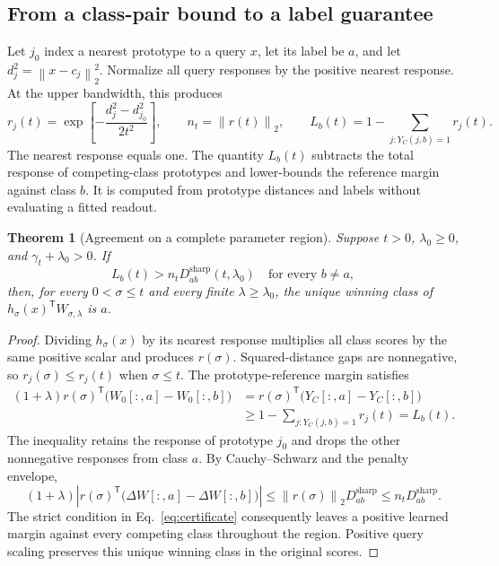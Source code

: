 \documentclass[preprint,12pt,authoryear]{elsarticle}
\newtheorem{theorem}{Theorem}
\newcommand{\norm}[1]{\left\lVert#1\right\rVert}
\newcommand{\tr}{\mathsf{T}}
\newcommand{\sharpb}{\mathrm{sharp}}
\begin{document}
\subsection{From a class-pair bound to a label guarantee}
Let $j_0$ index a nearest prototype to a query $x$, let its label be $a$, and let $d_j^2=\norm{x-c_j}_2^2$. Normalize all query responses by the positive nearest response. At the upper bandwidth, this produces
\begin{equation}
 r_j(t)=\exp\left[-\frac{d_j^2-d_{j_0}^2}{2t^2}\right],\qquad
 n_t=\norm{r(t)}_2,\qquad
 L_b(t)=1-\sum_{j:Y_C(j,b)=1}r_j(t).
 \label{eq:query}
\end{equation}
The nearest response equals one. The quantity $L_b(t)$ subtracts the total response of competing-class prototypes and lower-bounds the reference margin against class $b$. It is computed from prototype distances and labels without evaluating a fitted readout.

\begin{theorem}[Agreement on a complete parameter region]
Suppose $t>0$, $\lambda_0\geq0$, and $\gamma_t+\lambda_0>0$. If
\begin{equation}
 L_b(t)>n_tD^{\sharpb}_{ab}(t,\lambda_0)
 \quad\text{for every }b\ne a,
 \label{eq:certificate}
\end{equation}
then, for every $0<\sigma\leq t$ and every finite $\lambda\geq\lambda_0$, the unique winning class of $h_\sigma(x)^\tr W_{\sigma,\lambda}$ is $a$.
\label{thm:agreement}
\end{theorem}
\begin{proof}
Dividing $h_\sigma(x)$ by its nearest response multiplies all class scores by the same positive scalar and produces $r(\sigma)$. Squared-distance gaps are nonnegative, so $r_j(\sigma)\leq r_j(t)$ when $\sigma\leq t$. The prototype-reference margin satisfies
\begin{align*}
 (1+\lambda)r(\sigma)^\tr\bigl(W_0[:,a]-W_0[:,b]\bigr)
 &=r(\sigma)^\tr\bigl(Y_C[:,a]-Y_C[:,b]\bigr)\\
 &\geq 1-\sum_{j:Y_C(j,b)=1}r_j(t)=L_b(t).
\end{align*}
The inequality retains the response of prototype $j_0$ and drops the other nonnegative responses from class $a$. By Cauchy--Schwarz and the penalty envelope,
\[
 (1+\lambda)\left|r(\sigma)^\tr
       \bigl(\Delta W[:,a]-\Delta W[:,b]\bigr)\right|
 \leq \norm{r(\sigma)}_2D^{\sharpb}_{ab}
 \leq n_tD^{\sharpb}_{ab}.
\]
The strict condition in Eq.~\eqref{eq:certificate} consequently leaves a positive learned margin against every competing class throughout the region. Positive query scaling preserves this unique winning class in the original scores.
\end{proof}
\end{document}
